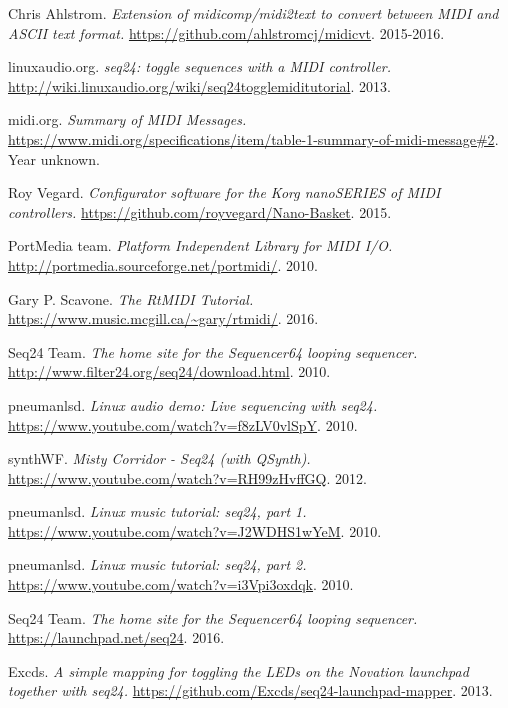 \begin{thebibliography}{99}
   Chris Ahlstrom.
   \emph{Extension of midicomp/midi2text to convert between MIDI and ASCII
      text format.}
   \url{https://github.com/ahlstromcj/midicvt}.
   2015-2016.

   linuxaudio.org.
   \emph{seq24: toggle sequences with a MIDI controller.}
   \url{http://wiki.linuxaudio.org/wiki/seq24togglemiditutorial}.
   2013.

   midi.org.
   \emph{Summary of MIDI Messages.}
   \url{https://www.midi.org/specifications/item/table-1-summary-of-midi-message#2}.
   Year unknown.

   Roy Vegard.
   \emph{Configurator software for the Korg nanoSERIES of MIDI controllers.}
   \url{https://github.com/royvegard/Nano-Basket}.
   2015.

   PortMedia team.
   \emph{Platform Independent Library for MIDI I/O.}
   \url{http://portmedia.sourceforge.net/portmidi/}.
   2010.

   Gary P. Scavone.
   \emph{The RtMIDI Tutorial.}
   \url{https://www.music.mcgill.ca/~gary/rtmidi/}.
   2016.

   Seq24 Team.
   \emph{The home site for the Sequencer64 looping sequencer.}
   \url{http://www.filter24.org/seq24/download.html}.
   2010.

   pneumanlsd.
   \emph{Linux audio demo: Live sequencing with seq24.}
   \url{https://www.youtube.com/watch?v=f8zLV0vlSpY}.
   2010.

   synthWF.
   \emph{Misty Corridor - Seq24 (with QSynth).}
   \url{https://www.youtube.com/watch?v=RH99zHvffGQ}.
   2012.

   pneumanlsd.
   \emph{Linux music tutorial: seq24, part 1.}
   \url{https://www.youtube.com/watch?v=J2WDHS1wYeM}.
   2010.
   
   pneumanlsd.
   \emph{Linux music tutorial: seq24, part 2.}
   \url{https://www.youtube.com/watch?v=i3Vpi3oxdqk}.
   2010.

   Seq24 Team.
   \emph{The home site for the Sequencer64 looping sequencer.}
   \url{https://launchpad.net/seq24}.
   2016.

   Excds.
   \emph{A simple mapping for toggling the LEDs on the Novation launchpad
   together with seq24.}
   \url{https://github.com/Excds/seq24-launchpad-mapper}.
   2013.


\end{thebibliography}

